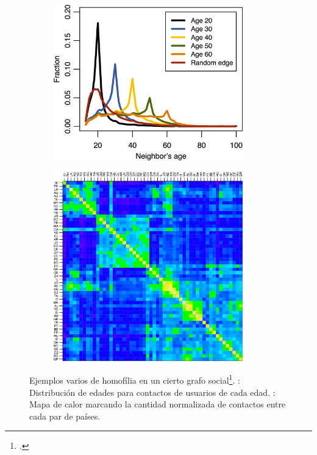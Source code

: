 \documentclass{beamer}
\begin{document}
\begin{frame}
	\begin{figure}
		\begin{subfigure}[b]{0.48\framewidth}
			\includegraphics[width=0.9\textwidth]{age_homophily.png}
			\caption{}%
			\label{fig:age_homophily}
		\end{subfigure}
		\begin{subfigure}[b]{0.48\framewidth}
			\hfill{}
			\includegraphics[width=0.9\textwidth]{country_homophily.png}
			\caption{}%
			\label{fig:country_homophily}
		\end{subfigure}
		\caption{Ejemplos varios de homofília en un cierto grafo social\footcite{ugander2011anatomy}. : Distribución de edades para contactos de usuarios de cada edad. : Mapa de calor marcando la cantidad normalizada de contactos entre cada par de países.}
	\end{figure}


\end{frame}
\end{document}
